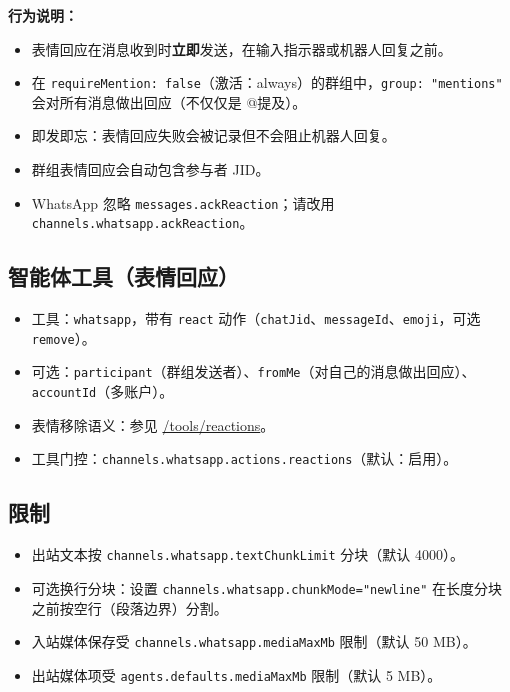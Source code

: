 \textbf{行为说明：}

\begin{itemize}
  \item 表情回应在消息收到时\textbf{立即}发送，在输入指示器或机器人回复之前。
  \item 在 \texttt{requireMention: false}（激活：always）的群组中，\texttt{group: "mentions"} 会对所有消息做出回应（不仅仅是 @提及）。
  \item 即发即忘：表情回应失败会被记录但不会阻止机器人回复。
  \item 群组表情回应会自动包含参与者 JID。
  \item WhatsApp 忽略 \texttt{messages.ackReaction}；请改用 \texttt{channels.whatsapp.ackReaction}。
\end{itemize}


\subsection{智能体工具（表情回应）}


\begin{itemize}
  \item 工具：\texttt{whatsapp}，带有 \texttt{react} 动作（\texttt{chatJid}、\texttt{messageId}、\texttt{emoji}，可选 \texttt{remove}）。
  \item 可选：\texttt{participant}（群组发送者）、\texttt{fromMe}（对自己的消息做出回应）、\texttt{accountId}（多账户）。
  \item 表情移除语义：参见 \href{/tools/reactions}{/tools/reactions}。
  \item 工具门控：\texttt{channels.whatsapp.actions.reactions}（默认：启用）。
\end{itemize}


\subsection{限制}


\begin{itemize}
  \item 出站文本按 \texttt{channels.whatsapp.textChunkLimit} 分块（默认 4000）。
  \item 可选换行分块：设置 \texttt{channels.whatsapp.chunkMode="newline"} 在长度分块之前按空行（段落边界）分割。
  \item 入站媒体保存受 \texttt{channels.whatsapp.mediaMaxMb} 限制（默认 50 MB）。
  \item 出站媒体项受 \texttt{agents.defaults.mediaMaxMb} 限制（默认 5 MB）。
\end{itemize}


